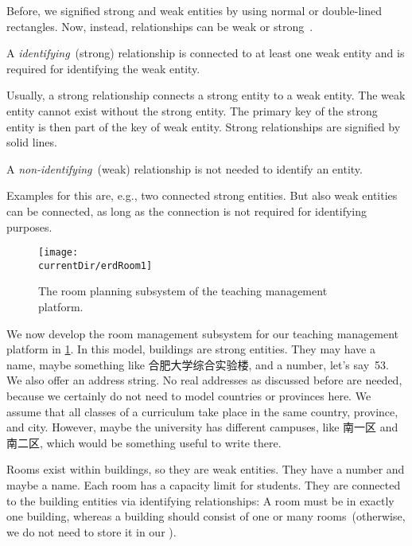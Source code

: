 Before, we signified strong and weak entities by using normal or double-lined rectangles.
Now, instead, relationships can be weak or strong~\cite{P2024C6DS:EM}.%
%
\begin{definition}%
A \emph{identifying}~(strong) relationship is connected to at least one weak entity and is required for identifying the weak entity. %
\end{definition}%
%
Usually, a strong relationship connects a strong entity to a weak entity.
The weak entity cannot exist without the strong entity.
The primary key of the strong entity is then part of the key of weak entity.
Strong relationships are signified by solid lines.%
%
\begin{definition}%
A \emph{non-identifying}~(weak) relationship is not needed to identify an entity.%
\end{definition}%
Examples for this are, e.g., two connected strong entities.
But also weak entities can be connected, as long as the connection is not required for identifying purposes.

\begin{figure}%
\centering%
\texttt{[image: \\currentDir/erdRoom1]}%
\caption{The room planning subsystem of the teaching management platform.}%
\label{fig:erdRoom1}%
\end{figure}%
%
We now develop the room management subsystem for our teaching management platform in \cref{fig:erdRoom1}.
In this model, buildings are strong entities.
They may have a name, maybe something like 合肥大学综合实验楼, and a number, let's say~53.
We also offer an address string.
No real addresses as discussed before are needed, because we certainly do not need to model countries or provinces here.
We assume that all classes of a curriculum take place in the same country, province, and city.
However, maybe the university has different campuses, like 南一区 and 南二区, which would be something useful to write there.

Rooms exist within buildings, so they are weak entities.
They have a number and maybe a name.
Each room has a capacity limit for students.
They are connected to the building entities via identifying relationships:
A room must be in exactly one building, whereas a building should consist of one or many rooms~(otherwise, we do not need to store it in our \db).

